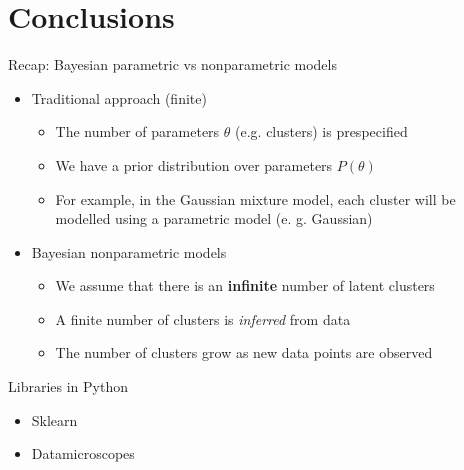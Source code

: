 \documentclass[handout]{beamer}
\begin{document}
\section{Conclusions}
\begin{frame}{Recap: Bayesian parametric vs nonparametric models}
    \begin{itemize}
        \item Traditional approach (finite)
           \begin{itemize}
               \item The number of parameters $\theta$ (e.g. clusters) is prespecified
               \item We have a prior distribution over parameters $P(\theta)$
               \item For example, in the Gaussian mixture model, each cluster will be modelled
                   using a parametric model (e. g. Gaussian)
           \end{itemize}
        \item Bayesian nonparametric models
           \begin{itemize}
               \item We assume that there is an \textbf{infinite} number of latent clusters
               \item A finite number of clusters is \textit{inferred} from data
               \item The number of clusters grow as new data points are observed
           \end{itemize}
    \end{itemize}
\end{frame}

\begin{frame}{Libraries in Python}
	\begin{itemize}
        \item Sklearn
        \item Datamicroscopes
	\end{itemize}
\end{frame}

\end{document}
